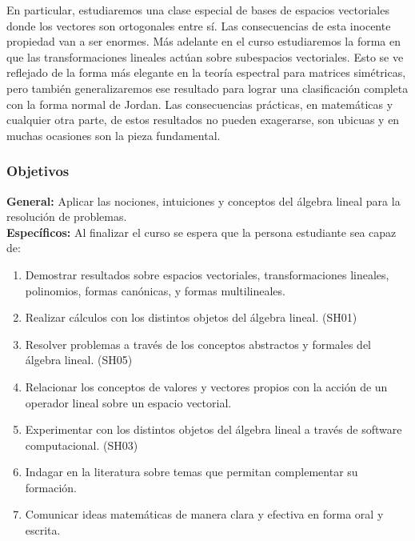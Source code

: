 \begin{refsection}
En particular, estudiaremos una clase especial de bases
de espacios vectoriales donde los vectores son ortogonales entre s\'i. Las consecuencias
de esta inocente propiedad van a ser enormes.
M\'as adelante en el curso estudiaremos la forma en que las transformaciones lineales act\'uan sobre
subespacios vectoriales. Esto se ve reflejado de la forma m\'as elegante en la teor\'ia
espectral para matrices sim\'etricas, pero tambi\'en generalizaremos ese resultado para
lograr una clasificaci\'on completa con la forma normal de Jordan. Las consecuencias
pr\'acticas, en matem\'aticas y cualquier otra parte, de estos resultados no pueden exagerarse, son ubicuas y en muchas ocasiones son la pieza fundamental.

\subsubsection*{Objetivos}

\textbf{General:} Aplicar las nociones, intuiciones y conceptos del álgebra lineal para la resolución de problemas. \\

\textbf{Específicos:} Al finalizar el curso se espera que la persona estudiante sea capaz de:

\begin{enumerate}
\item Demostrar resultados sobre espacios vectoriales, transformaciones lineales, polinomios, formas canónicas, y formas multilineales.
\item Realizar cálculos con los distintos objetos del álgebra lineal. (SH01)
\item Resolver problemas a través de los conceptos abstractos y formales del álgebra lineal. (SH05)
\item Relacionar los conceptos de valores y vectores propios con la acción de un operador lineal sobre un espacio vectorial.
\item Experimentar con los distintos objetos del álgebra lineal a través de software computacional. (SH03)
\item Indagar en la literatura sobre temas que permitan complementar su formación.
\item Comunicar ideas matemáticas de manera clara y efectiva en forma oral y escrita.
\end{enumerate}


\end{refsection}
